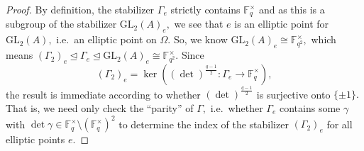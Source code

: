 \documentclass[11pt]{amsart}
\newtheorem{corollary}[theorem]{Corollary}
\theoremstyle{definition}
\numberwithin{equation}{section}
\newcommand{\GL}{\mathrm{GL}} 	%
\newcommand{\bbF}{\mathbb{F}}		%
\begin{document}
		\begin{proof}
			By definition, the stabilizer $\Gamma_e$ strictly contains $\bbF_q^{\times}$ and as this is a subgroup of the stabilizer $\GL_2(A)_e,$ we see that $e$ is an elliptic point for $\GL_2(A),$ i.e.\ an elliptic point on $\Omega.$ So, we know $\GL_2(A)_e\cong \bbF_{q^2}^{\times},$ which means $(\Gamma_2)_e\unlhd \Gamma_e\unlhd \GL_2(A)_e\cong \bbF_{q^2}^{\times}.$ Since 
			\[(\Gamma_2)_e=\ker((\det)^{\frac{q-1}{2}}:\Gamma_e\to \bbF_q^{\times}),\] the result is immediate according to whether $\displaystyle{(\det)^{\frac{q-1}{2}}}$ is surjective onto $\{\pm 1\}.$ That is, we need only check the ``parity'' of $\Gamma,$ i.e.\ whether $\Gamma_e$ contains some $\gamma$ with $\det\gamma\in \bbF_q^{\times}\setminus (\bbF_q^{\times})^2$ to determine the index of the stabilizer $(\Gamma_2)_e$ for all elliptic points $e.$
		\end{proof}
		
\end{document}
